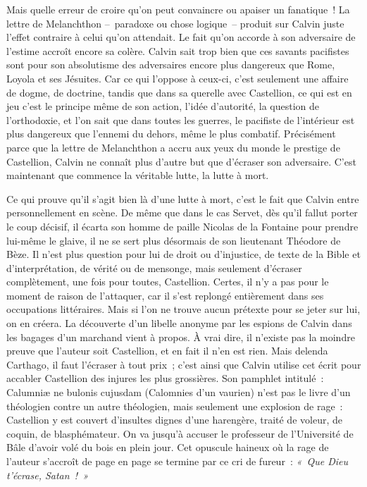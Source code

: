 \documentclass[french,twoside]{book} %
\begin{document}
\noindent Mais quelle erreur de croire qu’on peut convaincre ou apaiser un fanatique ! La lettre de Melanchthon – paradoxe ou chose logique – produit sur Calvin juste l’effet contraire à celui qu’on attendait. Le fait qu’on accorde à son adversaire de l’estime accroît encore sa colère. Calvin sait trop bien que ces savants pacifistes sont pour son absolutisme des adversaires encore plus dangereux que Rome, Loyola et ses Jésuites. Car ce qui l’oppose à ceux-ci, c’est seulement une affaire de dogme, de doctrine, tandis que dans sa querelle avec Castellion, ce qui est en jeu c’est le principe même de son action, l’idée d’autorité, la question de l’orthodoxie, et l’on sait que dans toutes les guerres, le pacifiste de l’intérieur est plus dangereux que l’ennemi du dehors, même le plus combatif. Précisément parce que la lettre de Melanchthon a accru aux yeux du monde le prestige de Castellion, Calvin ne connaît plus d’autre but que d’écraser son adversaire. C’est maintenant que commence la véritable lutte, la lutte à mort.\par
Ce qui prouve qu’il s’agit bien là d’une lutte à mort, c’est le fait que Calvin entre personnellement en scène. De même que dans le cas Servet, dès qu’il fallut porter le coup décisif, il écarta son homme de paille Nicolas de la Fontaine pour prendre lui-même le glaive, il ne se sert plus désormais de son lieutenant Théodore de Bèze. Il n’est plus question pour lui de droit ou d’injustice, de texte de la Bible et d’interprétation, de vérité ou de mensonge, mais seulement d’écraser complètement, une fois pour toutes, Castellion. Certes, il n’y a pas pour le moment de raison de l’attaquer, car il s’est replongé entièrement dans ses occupations littéraires. Mais si l’on ne trouve aucun prétexte pour se jeter sur lui, on en créera. La découverte d’un libelle anonyme par les espions de Calvin dans les bagages d’un marchand vient à propos. À vrai dire, il n’existe pas la moindre preuve que l’auteur soit Castellion, et en fait il n’en est rien. Mais delenda Carthago, il faut l’écraser à tout prix ; c’est ainsi que Calvin utilise cet écrit pour accabler Castellion des injures les plus grossières. Son pamphlet intitulé : Calumniæ ne bulonis cujusdam (Calomnies d’un vaurien) n’est pas le livre d’un théologien contre un autre théologien, mais seulement une explosion de rage : Castellion y est couvert d’insultes dignes d’une harengère, traité de voleur, de coquin, de blasphémateur. On va jusqu’à accuser le professeur de l’Université de Bâle d’avoir volé du bois en plein jour. Cet opuscule haineux où la rage de l’auteur s’accroît de page en page se termine par ce cri de fureur : \emph{« Que Dieu t’écrase, Satan ! »}\par
\end{document}
